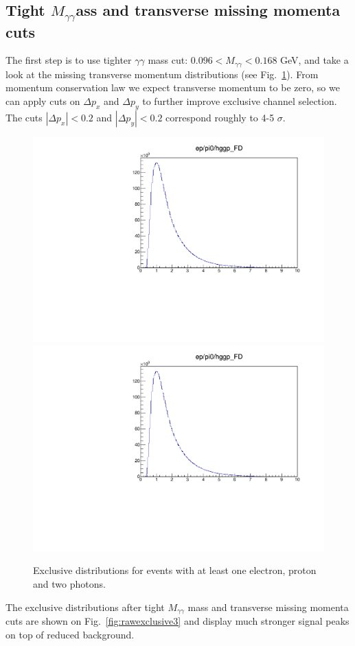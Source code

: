\subsection{Tight \texorpdfstring{$M_{\gamma\gamma} $} mass and transverse missing momenta cuts}

The first step is to use tighter $\gamma\gamma$ mass cut: $0.096<M_{\gamma\gamma}<0.168$ GeV, and take a look at the missing transverse momentum distributions (see Fig.~\ref{fig:ptdistributions}).
From momentum conservation law we expect transverse momentum to be zero, so we can apply cuts on $\Delta p_x$ and $\Delta p_y$ to further improve exclusive channel selection.
The cuts $|\Delta p_x|<0.2$ and $|\Delta p_y|<0.2$ correspond roughly to 4-5 $\sigma$.

\begin{figure}[hbt]
	\centering
	\includegraphics[page=24,width=0.47\linewidth]{Chapters/Ch4-BaseAnalysis/1_Exclusivity_Cuts/figures/eppi0.exclusive.pdf}
	\includegraphics[page=25,width=0.47\linewidth]{Chapters/Ch4-BaseAnalysis/1_Exclusivity_Cuts/figures/eppi0.exclusive.pdf}
	
	\caption{Exclusive distributions for events with at least one electron, proton and two photons.}
	\label{fig:ptdistributions}
\end{figure}

The exclusive distributions after tight $M_{\gamma\gamma}$ mass and transverse missing momenta cuts are shown on Fig.~\ref{fig:rawexclusive3} and display much stronger signal peaks on top of reduced background.

